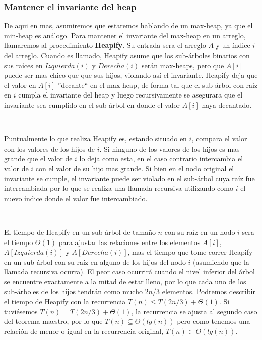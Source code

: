 \documentclass[10pt, a4paper]{report}
\begin{document}
\subsubsection{Mantener el invariante del heap}

De aqui en mas, asumiremos que estaremos hablando de un max-heap, ya que el min-heap es an\'alogo. Para mantener el invariante del max-heap en un arreglo, llamaremos al procedimiento \textbf{Heapify}. Su entrada sera el arreglo $A$ y un \'indice $i$ del arreglo. Cuando es llamado, Heapify asume que los sub-\'arboles binarios con sus ra\'ices en $Izquierda(i)$ y $Derecha(i)$ ser\'an max-heaps, pero que $A[i]$ puede ser mas chico que que sus hijos, violando as\'i el invariante. Heapify deja que el valor en $A[i]$ ''decante`` en el max-heap, de forma tal que el sub-\'arbol con raiz en $i$ cumpla el invariante del heap y luego recursivamente se asegurara que el invariante sea cumplido en el sub-\'arbol en donde el valor $A[i]$ haya decantado.

~

Puntualmente lo que realiza Heapify es, estando situado en $i$, compara el valor con los valores de los hijos de $i$. Si ninguno de los valores de los hijos es mas grande que el valor de $i$ lo deja como esta, en el caso contrario intercambia el valor de $i$ con el valor de su hijo mas grande. Si bien en el nodo original el invariante se cumple, el invariante puede ser violado en el sub-\'arbol cuya ra\'iz fue intercambiada por lo que se realiza una llamada recursiva utilizando como $i$ el nuevo \'indice donde el valor fue intercambiado.

~

El tiempo de Heapify en un sub-\'arbol de tama\~no $n$ con su ra\'iz en un nodo $i$ sera el tiempo $\Theta(1)$ para ajustar las relaciones entre los elementos $A[i]$, $A[Izquierda(i)]$ y $A[Derecha(i)]$, mas el tiempo que tome correr Heapify en un sub-\'arbol con su ra\'iz en alguno de los hijos del nodo $i$ (asumiendo que la llamada recursiva ocurra). El peor caso ocurrir\'a cuando el nivel inferior del \'arbol se encuentre exactamente a la mitad de estar lleno, por lo que cada uno de los sub-\'arboles de los hijos tendr\'an como mucho $2n/3$ elementos. Podremos describir el tiempo de Heapify con la recurrencia $T(n) \leq T(2n/3) + \Theta(1)$. Si tuvi\'esemos $T(n) = T(2n/3) + \Theta(1)$, la recurrencia se ajusta al segundo caso del teorema maestro, por lo que $T(n) \subseteq \Theta(lg(n))$ pero como tenemos una relaci\'on de menor o igual en la recurrencia original, $T(n) \subset O(lg(n))$.
\end{document}
